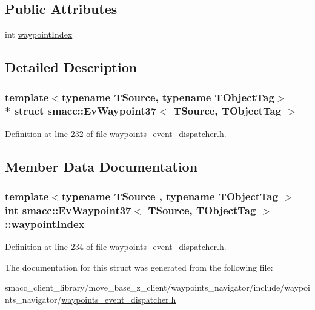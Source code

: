 \subsection*{Public Attributes}
\begin{DoxyCompactItemize}
\item 
int \hyperlink{structsmacc_1_1EvWaypoint37_a3ef3dd18aa25e240e0686f05c092c644}{waypoint\+Index}
\end{DoxyCompactItemize}


\subsection{Detailed Description}
\subsubsection*{template$<$typename T\+Source, typename T\+Object\+Tag$>$\\*
struct smacc\+::\+Ev\+Waypoint37$<$ T\+Source, T\+Object\+Tag $>$}



Definition at line 232 of file waypoints\+\_\+event\+\_\+dispatcher.\+h.



\subsection{Member Data Documentation}
\subsubsection[{\texorpdfstring{waypoint\+Index}{waypointIndex}}]{\setlength{\rightskip}{0pt plus 5cm}template$<$typename T\+Source , typename T\+Object\+Tag $>$ int {\bf smacc\+::\+Ev\+Waypoint37}$<$ T\+Source, T\+Object\+Tag $>$\+::waypoint\+Index}\hypertarget{structsmacc_1_1EvWaypoint37_a3ef3dd18aa25e240e0686f05c092c644}{}\label{structsmacc_1_1EvWaypoint37_a3ef3dd18aa25e240e0686f05c092c644}


Definition at line 234 of file waypoints\+\_\+event\+\_\+dispatcher.\+h.



The documentation for this struct was generated from the following file\+:\begin{DoxyCompactItemize}
\item 
smacc\+\_\+client\+\_\+library/move\+\_\+base\+\_\+z\+\_\+client/waypoints\+\_\+navigator/include/waypoints\+\_\+navigator/\hyperlink{waypoints__event__dispatcher_8h}{waypoints\+\_\+event\+\_\+dispatcher.\+h}\end{DoxyCompactItemize}
